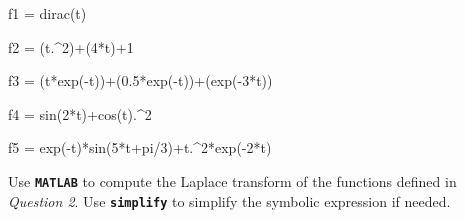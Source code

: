 \documentclass{article}
\begin{document}
\begin{matlabcode}
f1 = dirac(t)
\end{matlabcode}
\begin{matlabcode}
f2 = (t.^2)+(4*t)+1
\end{matlabcode}
\begin{matlabcode}
f3 = (t*exp(-t))+(0.5*exp(-t))+(exp(-3*t))
\end{matlabcode}
\begin{matlabcode}
f4 = sin(2*t)+cos(t).^2
\end{matlabcode}
\begin{matlabcode}
f5 = exp(-t)*sin(5*t+pi/3)+t.^2*exp(-2*t)
\end{matlabcode}



\begin{par}
\begin{flushleft}
Use \texttt{\textbf{MATLAB}} to compute the Laplace transform of the functions defined in \textit{Question 2}. Use \texttt{\textbf{simplify}} to simplify the symbolic expression if needed.
\end{flushleft}
\end{par}
\end{document}
